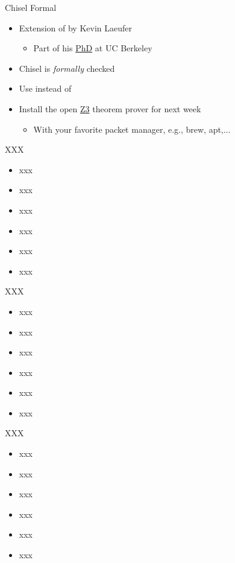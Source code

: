 \begin{frame}[fragile]{Chisel Formal}
\begin{itemize}
\item Extension of  by Kevin Laeufer
\begin{itemize}
\item Part of his \href{https://www2.eecs.berkeley.edu/Pubs/TechRpts/2024/EECS-2024-157.pdf}{PhD} at UC Berkeley
\end{itemize}
\item Chisel  is \emph{formally} checked
\item Use  instead of 
\item Install the open \href{https://github.com/Z3Prover/z3}{Z3} theorem prover for next week
\begin{itemize}
\item With your favorite packet manager, e.g., brew, apt,...
\end{itemize}
\end{itemize}
\end{frame}

\begin{frame}[fragile]{XXX}
\begin{itemize}
\item xxx
\item xxx
\item xxx
\item xxx
\item xxx
\item xxx
\end{itemize}
\end{frame}

\begin{frame}[fragile]{XXX}
\begin{itemize}
\item xxx
\item xxx
\item xxx
\item xxx
\item xxx
\item xxx
\end{itemize}
\end{frame}

\begin{frame}[fragile]{XXX}
\begin{itemize}
\item xxx
\item xxx
\item xxx
\item xxx
\item xxx
\item xxx
\end{itemize}
\end{frame}





